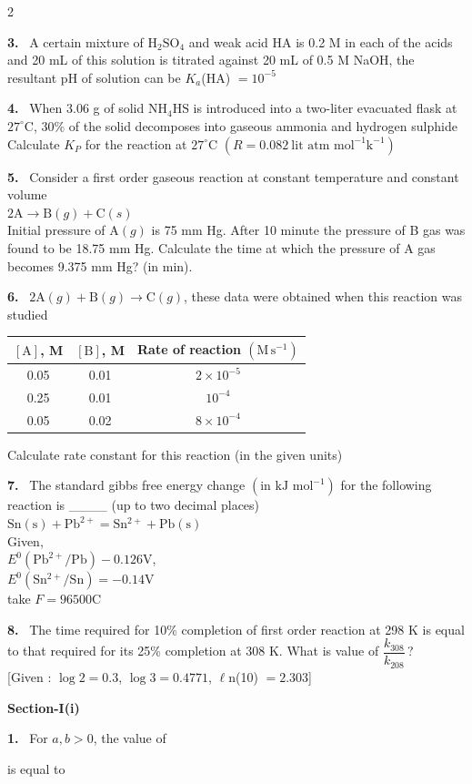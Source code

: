 \documentclass[10pt]{extarticle}
\newcommand{\partsec}[2]{\par\medskip\noindent{\large\bfseries PART-#1: #2}\par\smallskip}
\newcommand{\sect}[1]{\par\smallskip\noindent\textbf{#1}\par}
\newcommand{\qn}[1]{\par\smallskip\noindent\textbf{#1.}~}
\begin{document}
\begin{multicols}{2}
\qn{3} A certain mixture of $\mathrm{H_2SO_4}$ and weak acid HA is 0.2 M in each of the acids and 20 mL of this solution is titrated against 20 mL of 0.5 M NaOH, the resultant pH of solution can be $K_a$(HA) $=10^{-5}$
\qn{4} When 3.06 g of solid $\mathrm{NH_4HS}$ is introduced into a two-liter evacuated flask at $27^\circ$C, 30\% of the solid decomposes into gaseous ammonia and hydrogen sulphide
Calculate $K_P$ for the reaction at $27^\circ$C $\left(R=0.082\ \text{lit atm mol}^{-1}\text{k}^{-1}\right)$
\qn{5} Consider a first order gaseous reaction at constant temperature and constant volume\\
$2\mathrm A\to\mathrm B(g)+\mathrm C(s)$\\
Initial pressure of $\mathrm A(g)$ is 75 mm Hg. After 10 minute the pressure of B gas was found to be 18.75 mm Hg. Calculate the time at which the pressure of A gas becomes 9.375 mm Hg? (in min).
\qn{6} $2\mathrm A(g)+\mathrm B(g)\to\mathrm C(g)$, these data were obtained when this reaction was studied
\begin{center}\small
\begin{tabular}{|c|c|c|}\hline
$[\mathrm A]$, M & $[\mathrm B]$, M & Rate of reaction $\left(\mathrm{M\,s^{-1}}\right)$\\\hline
0.05 & 0.01 & $2\times10^{-5}$\\\hline
0.25 & 0.01 & $10^{-4}$\\\hline
0.05 & 0.02 & $8\times10^{-4}$\\\hline
\end{tabular}
\end{center}
Calculate rate constant for this reaction (in the given units)
\qn{7} The standard gibbs free energy change $\left(\text{in kJ mol}^{-1}\right)$ for the following reaction is \_\_\_\_ (up to two decimal places)\\
$\mathrm{Sn(s)+Pb^{2+}=Sn^{2+}+Pb(s)}$\\
Given,\\
$E^0\left(\mathrm{Pb^{2+}/Pb}\right)-0.126$V,\\
$E^0\left(\mathrm{Sn^{2+}/Sn}\right)=-0.14$V\\
take $F=96500$C
\qn{8} The time required for 10\% completion of first order reaction at 298 K is equal to that required for its 25\% completion at 308 K. What is value of $\dfrac{k_{308}}{k_{208}}$\,?\\
{[}Given : $\log2=0.3$, $\log3=0.4771$, $\ell$n(10) $=2.303$]
\partsec{3}{MATHEMATICS}
\sect{Section-I(i)}
\qn{1} For $a,b>0$, the value of \par\smallskip\noindent{}\par\smallskip\noindent is equal to

\end{multicols}
\end{document}
